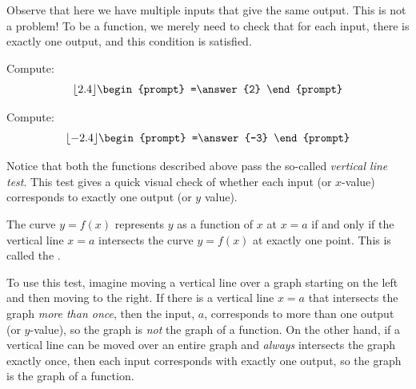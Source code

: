 \documentclass{ximera}
\begin{document}
\begin{example}
\begin{image}
\end{image}
Observe that here we have multiple inputs that give
the same output.  This is not a problem! To be a function, we
merely need to check that for each input, there is exactly one output,
and this condition is satisfied.
\end{example}

\begin{question}
  Compute:
  \[
  \lfloor 2.4 \rfloor
  \begin{prompt}
    =\answer{2}
  \end{prompt}
  \]
  \begin{question}
  Compute:
  \[
  \lfloor -2.4 \rfloor
  \begin{prompt}
    =\answer{-3}
  \end{prompt}
  \]
\end{question}
\end{question}


Notice that both the functions described above pass the so-called
\textit{vertical line test}.  This test gives a quick visual check of whether each input (or $x$-value) corresponds to exactly one output (or $y$ value).

\begin{theorem}
The curve $y=f(x)$ represents $y$ as a function of $x$ at $x=a$ if and
only if the vertical line $x=a$ intersects the curve $y=f(x)$ at
exactly one point. This is called the .
\end{theorem}

To use this test, imagine moving a vertical line over a graph starting on the left and then moving to the right.  If there is a vertical line $x=a$ that intersects the graph \textit{more than once}, then the input, $a$, corresponds to more than one output (or $y$-value), so the graph is \textit{not} the graph of a function.  On the other hand, if a vertical line can be moved over an entire graph and \textit{always} intersects the graph exactly once, then each input corresponds with exactly one output, so the graph is the graph of a function.
\end{document}
